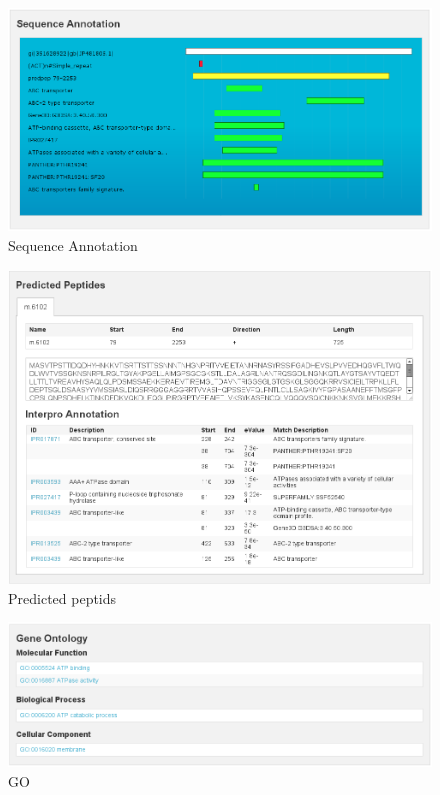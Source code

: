 \documentclass[english]{scrartcl}
\begin{document}
\begin{figure}
\begin{center}
  \includegraphics[width=\textwidth]{figures/sequence_annotation.png}
  \caption{Sequence Annotation}
  \label{fig:annotation}
\end{center}
\end{figure}

\begin{figure}
\begin{center}
  \includegraphics[width=\textwidth]{figures/predicted_peptides.png}
  \caption{Predicted peptids}
  \label{fig:predpep}
\end{center}
\end{figure}

\begin{figure}
\begin{center}
  \includegraphics[width=\textwidth]{figures/go.png}
  \caption{GO}
  \label{fig:go}
\end{center}
\end{figure}
\end{document}
